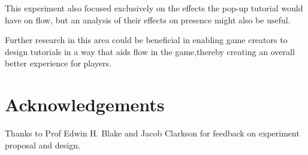 \documentclass{acmsiggraph}
\begin{document}
This experiment also focused exclusively on the effects the pop-up tutorial would have on flow, but an analysis of their effects on presence might also be useful.

Further research in this area could be beneficial in enabling game creators to design tutorials in a way that aids flow in the game,thereby creating an overall better experience for players.

\section*{Acknowledgements}

Thanks to Prof Edwin H. Blake and Jacob Clarkson for feedback on experiment proposal and design.


\nocite{*}

\end{document}
